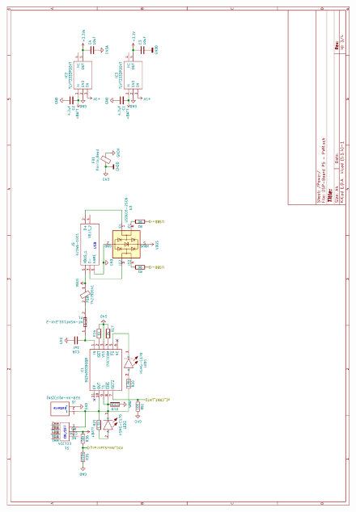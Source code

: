\begin{appendix}
\begin{figure}[h]
	\centering
	\includegraphics[width=0.95\linewidth]{appendix/DSP-Board-Schema-V1-1(3).pdf}
\end{figure}


\end{appendix}
